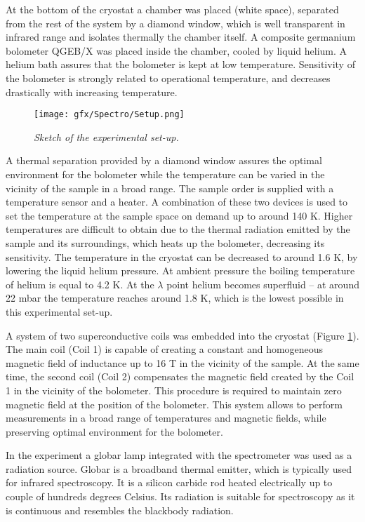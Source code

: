 \documentclass[titlepage,a4paper]{book}
\begin{document}
At the bottom of the cryostat a chamber was placed (white space), separated from the rest of the system by a diamond window, which is well transparent in infrared range and isolates thermally the chamber itself. A composite germanium bolometer QGEB/X was placed inside the chamber, cooled by liquid helium. A helium bath assures that the bolometer is kept at low temperature. Sensitivity of the bolometer is strongly related to operational temperature, and decreases drastically with increasing temperature. 

\begin{figure}[ht]
	\centering
	\texttt{[image: gfx/Spectro/Setup.png]}
	\vspace{-10pt}
	\caption{\textit{Sketch of the experimental set-up.}}
	\label{fig:Experimental_setup}
\end{figure}

A thermal separation provided by a diamond window assures the optimal environment for the bolometer while the temperature can be varied in the vicinity of the sample in a broad range. The sample order is supplied with a temperature sensor and a heater. A combination of these two devices is used to set the temperature at the sample space on demand up to around 140 K. Higher temperatures are difficult to obtain due to the thermal radiation emitted by the sample and its surroundings, which heats up the bolometer, decreasing its sensitivity. The temperature in the cryostat can be decreased to around 1.6 K, by lowering the liquid helium pressure. At ambient pressure the boiling temperature of helium is equal to 4.2 K. At the $\lambda$ point helium becomes superfluid -- at around 22 mbar the temperature reaches around 1.8 K, which is the lowest possible in this experimental set-up.

A system of two superconductive coils was embedded into the cryostat (Figure \ref{fig:Experimental_setup}). The main coil (Coil 1) is capable of creating a constant and homogeneous magnetic field of inductance up to 16 T in the vicinity of the sample. At the same time, the second coil (Coil 2) compensates the magnetic field created by the Coil 1 in the vicinity of the bolometer. This procedure is required to maintain zero magnetic field at the position of the bolometer. This system allows to perform measurements in a broad range of temperatures and magnetic fields, while preserving optimal environment for the bolometer.

In the experiment a globar lamp integrated with the spectrometer was used as a radiation source. Globar is a broadband thermal emitter, which is typically used for infrared spectroscopy. It is a silicon carbide rod heated electrically up to couple of hundreds degrees Celsius. Its radiation is suitable for spectroscopy as it is continuous and resembles the blackbody radiation.
\end{document}
